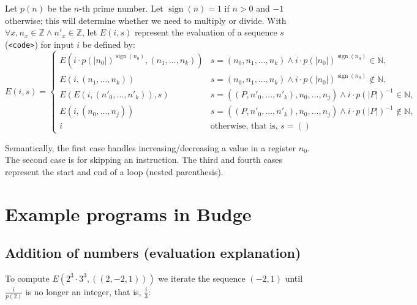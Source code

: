 \documentclass{article}
\DeclareMathOperator{\sign}{sign}
\begin{document}
Let $p(n)$ be the $n$-th prime number. Let $\sign(n) = 1$ if $n>0$ and $-1$ otherwise; this will determine whether we need to multiply or divide. With $\forall x, n_x \in \mathbb{Z} \land n'_x \in \mathbb{Z}$, let $E(i, s)$ represent the evaluation of a sequence $s$ (\texttt{<code>}) for input $i$ be defined by:
$$ E(i, s) = {
\begin{cases}
E(i \cdot p(|n_0|)^{\sign(n_0)}, (n_1, \ldots, n_k)) & s = (n_0, n_1, \ldots, n_k) \land i \cdot p(|n_0|)^{\sign(n_0)} \in \mathbb{N}, \\
E(i, (n_1, \ldots, n_k)) & s = (n_0, n_1, \ldots, n_k) \land i \cdot p(|n_0|)^{\sign(n_0)} \notin \mathbb{N}, \\
E(E(i, (n'_0, \ldots, n'_k)), s) & s = ((P, n'_0, \ldots, n'_k), n_0, \ldots, n_j) \land i \cdot p(|P|)^{-1} \in \mathbb{N}, \\
E(i, (n_0, \ldots, n_j)) & s = ((P, n'_0, \ldots, n'_k), n_0, \ldots, n_j) \land i \cdot p(|P|)^{-1} \notin \mathbb{N}, \\
i & {\text{otherwise, that is, } s = ()}\end{cases}} $$

Semantically, the first case handles increasing/decreasing a value in a register $n_0$. The second case is for skipping an instruction. The third and fourth cases represent the start and end of a loop (nested parenthesis).

\section{Example programs in Budge}

\subsection{Addition of numbers (evaluation explanation)}

To compute $E(2^3 \cdot 3^3, ((2, -2, 1)))$ we iterate the sequence $(-2, 1)$ until $\frac{i}{p(2)}$ is no longer an integer, that is, $\frac{i}{3}$:
\end{document}
